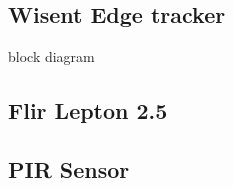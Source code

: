 \subsection{ Wisent Edge tracker}



    block diagram

\subsection{ Flir Lepton 2.5}
\subsection{ PIR Sensor}

%
%
%
%
